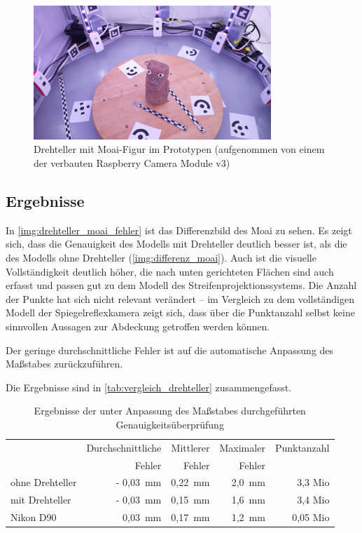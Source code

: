 \documentclass[./00PhotoBox.tex]{subfiles}
\begin{document}
\begin{figure}
    \centering
    \includegraphics[width=0.8\textwidth]{img/drehteller_moai.jpg}
    \caption{Drehteller mit Moai-Figur im Prototypen (aufgenommen von einem der verbauten Raspberry Camera Module v3)}
    \label{img:drehteller_moai}
\end{figure}

\subsection{Ergebnisse}

In \autoref{img:drehteller_moai_fehler} ist das Differenzbild des Moai zu sehen. Es zeigt sich, dass die Genauigkeit des Modells mit Drehteller deutlich besser ist, als die des Modells ohne Drehteller (\autoref{img:differenz_moai}). Auch ist die visuelle Vollständigkeit deutlich höher, die nach unten gerichteten Flächen sind auch erfasst und passen gut zu dem Modell des Streifenprojektionssystems. Die Anzahl der Punkte hat sich nicht relevant verändert -- im Vergleich zu dem vollständigen Modell der Spiegelreflexkamera zeigt sich, dass über die Punktanzahl selbst keine sinnvollen Aussagen zur Abdeckung getroffen werden können.

Der geringe durchschnittliche Fehler ist auf die automatische Anpassung des Maßstabes zurückzuführen.

Die Ergebnisse sind in \autoref{tab:vergleich_drehteller} zusammengefasst.

\begin{table}
    \centering
    \caption{Ergebnisse der unter Anpassung des Maßstabes durchgeführten Genauigkeitsüberprüfung}
    \label{tab:vergleich_drehteller}
    \begin{tabular}{l|r|r|r|r}
        \toprule
                        & Durchschnittliche & Mittlerer & Maximaler & Punktanzahl \\
                        & Fehler            & Fehler    & Fehler    &             \\
        \midrule
        ohne Drehteller & - 0,03~mm         & 0,22~mm   & 2,0~mm    & 3,3 Mio     \\
        mit Drehteller  & - 0,03~mm         & 0,15~mm   & 1,6~mm    & 3,4 Mio     \\
        Nikon D90       & 0,03~mm           & 0,17~mm   & 1,2~mm    & 0,05 Mio    \\
        \bottomrule
    \end{tabular}
\end{table}
\end{document}
